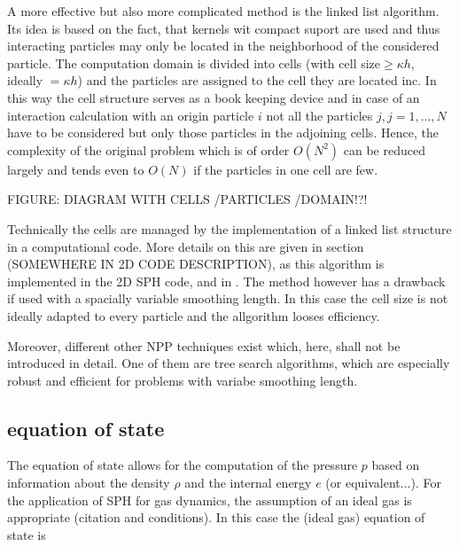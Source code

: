 \documentclass{report}
\begin{document}
A more effective but also more complicated method is the linked list
algorithm. Its idea is based on the fact, that kernels wit compact suport are
used and thus interacting particles may only be located in the neighborhood of
the considered particle. The computation domain is divided into cells (with
cell size$\ge \kappa h$, ideally $=\kappa h$) and the
particles are assigned to the cell they are located inc\cite{Monaghan1983}. In this way the cell
structure serves as a book keeping device and in case of an interaction
calculation with an origin particle $i$ not all the particles $j,j={1,...,N}$ have
to be considered but only those particles in the adjoining cells. Hence, the
complexity of the original problem which is of order $O(N^2)$ can be reduced
largely and tends even to $O(N)$ if the particles in one cell are few. 

FIGURE: DIAGRAM WITH CELLS /PARTICLES /DOMAIN!?!

Technically the cells are managed by the implementation of a linked list
structure in a computational code. More details on this are given in section
(SOMEWHERE IN 2D CODE DESCRIPTION), as this algorithm is implemented in the 2D
SPH code, and in \cite{Monaghan1985, Hockney1988}.
The method however has a drawback if used with a spacially variable smoothing
length. In this case the cell size is not ideally adapted to every particle
and the allgorithm looses efficiency.

Moreover, different other NPP techniques exist which, here, shall not be introduced in
detail. One of them are tree search algorithms\cite{Hernquist1989}, which are
especially robust and efficient for problems with variabe smoothing
length\cite{Liu2003}.



\subsection{equation of state}


The equation of state allows for the computation of the pressure $p$ based on
information about the density $\rho$ and the internal energy $e$ (or equivalent...). For the application of SPH for gas dynamics, the assumption of an ideal gas is appropriate (citation and conditions). In this case the (ideal gas) equation of state is


\end{document}
